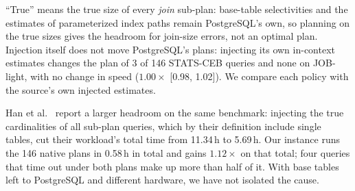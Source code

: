 \documentclass[sigconf, nonacm]{acmart}
\begin{document}
``True'' means the true size of every \emph{join} sub-plan: base-table
selectivities and the estimates of parameterized index paths remain
PostgreSQL's own, so planning on the true sizes gives the headroom for
join-size errors, not an optimal plan. Injection itself does not move
PostgreSQL's plans: injecting its own in-context estimates changes the plan of
3 of 146 STATS-CEB queries and none on JOB-light, with no change in speed
($1.00\times$ [0.98, 1.02]). We compare each policy with the source's own
injected estimates.

Han et al.~\cite{han2021cardest} report a larger headroom on the same
benchmark: injecting the true cardinalities of all sub-plan queries, which
by their definition include single tables, cut their workload's total time
from 11.34\,h to 5.69\,h. Our instance runs the 146 native plans in 0.58\,h in
total and gains $1.12\times$ on that total; four queries that time out under
both plans make up more than half of it. With base tables left to PostgreSQL
and different hardware, we have not isolated the cause.
\end{document}
